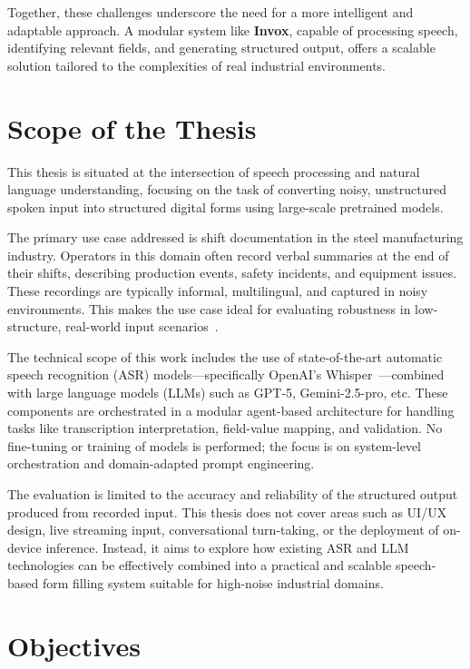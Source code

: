 Together, these challenges underscore the need for a more intelligent and adaptable approach. A modular system like \textbf{Invox}, capable of processing speech, identifying relevant fields, and generating structured output, offers a scalable solution tailored to the complexities of real industrial environments.


\section{Scope of the Thesis}

This thesis is situated at the intersection of speech processing and natural language understanding, focusing on the task of converting noisy, unstructured spoken input into structured digital forms using large-scale pretrained models.

The primary use case addressed is shift documentation in the steel manufacturing industry. Operators in this domain often record verbal summaries at the end of their shifts, describing production events, safety incidents, and equipment issues. These recordings are typically informal, multilingual, and captured in noisy environments. This makes the use case ideal for evaluating robustness in low-structure, real-world input scenarios~\cite{wang2021spoken, fathullah2023prompting}.

The technical scope of this work includes the use of state-of-the-art automatic speech recognition (ASR) models—specifically OpenAI's Whisper~\cite{radford2023whisper}—combined with large language models (LLMs) such as GPT-5, Gemini-2.5-pro, etc. These components are orchestrated in a modular agent-based architecture for handling tasks like transcription interpretation, field-value mapping, and validation. No fine-tuning or training of models is performed; the focus is on system-level orchestration and domain-adapted prompt engineering.

The evaluation is limited to the accuracy and reliability of the structured output produced from recorded input. This thesis does not cover areas such as UI/UX design, live streaming input, conversational turn-taking, or the deployment of on-device inference. Instead, it aims to explore how existing ASR and LLM technologies can be effectively combined into a practical and scalable speech-based form filling system suitable for high-noise industrial domains.


\section{Objectives}

